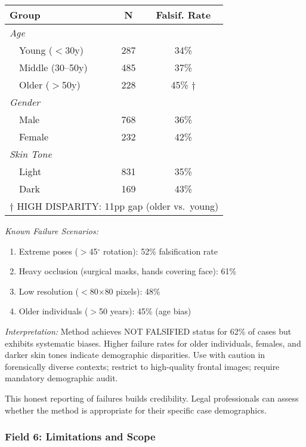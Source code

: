 \begin{table}[H]
\centering
\small
\begin{tabular}{lcc}
\toprule
\textbf{Group} & \textbf{N} & \textbf{Falsif. Rate} \\ \midrule
\multicolumn{3}{l}{\textit{Age}} \\
~~Young ($<$30y) & 287 & 34\% \\
~~Middle (30--50y) & 485 & 37\% \\
~~Older ($>$50y) & 228 & 45\% $\dagger$ \\ \midrule
\multicolumn{3}{l}{\textit{Gender}} \\
~~Male & 768 & 36\% \\
~~Female & 232 & 42\% \\ \midrule
\multicolumn{3}{l}{\textit{Skin Tone}} \\
~~Light & 831 & 35\% \\
~~Dark & 169 & 43\% \\ \bottomrule
\multicolumn{3}{l}{\footnotesize $\dagger$ HIGH DISPARITY: 11pp gap (older vs.\ young)}
\end{tabular}
\end{table}

\textit{Known Failure Scenarios:}
\begin{enumerate}
\item Extreme poses ($>$45$^\circ$ rotation): 52\% falsification rate
\item Heavy occlusion (surgical masks, hands covering face): 61\%
\item Low resolution ($<$80$\times$80 pixels): 48\%
\item Older individuals ($>$50 years): 45\% (age bias)
\end{enumerate}

\textit{Interpretation:} Method achieves NOT FALSIFIED status for 62\% of cases but exhibits systematic biases. Higher failure rates for older individuals, females, and darker skin tones indicate demographic disparities. Use with caution in forensically diverse contexts; restrict to high-quality frontal images; require mandatory demographic audit.

This honest reporting of failures builds credibility. Legal professionals can assess whether the method is appropriate for their specific case demographics.

\subsubsection{Field 6: Limitations and Scope}

